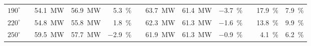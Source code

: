\documentclass[conf]{new-aiaa}
\begin{document}
\begin{table}[htpb!]
\begin{tabular}{@{}lcrrrcrrrcrr@{}}

\multicolumn{1}{l}{$190^{\circ}$} & & \SI[per-mode=symbol]{54.1}{\mega\watt} &\SI[per-mode=symbol]{56.9}{\mega\watt} &\SI[per-mode=symbol]{5.3}{\percent} & &\SI[per-mode=symbol]{63.7}{\mega\watt} &\SI[per-mode=symbol]{61.4}{\mega\watt} &\SI[per-mode=symbol]{-3.7}{\percent} & &\SI[per-mode=symbol]{17.9}{\percent} &\SI[per-mode=symbol]{7.9}{\percent} \\


\multicolumn{1}{l}{$220^{\circ}$} & & \SI[per-mode=symbol]{54.8}{\mega\watt} &\SI[per-mode=symbol]{55.8}{\mega\watt} &\SI[per-mode=symbol]{1.8}{\percent} & &\SI[per-mode=symbol]{62.3}{\mega\watt} &\SI[per-mode=symbol]{61.3}{\mega\watt} &\SI[per-mode=symbol]{-1.6}{\percent} & &\SI[per-mode=symbol]{13.8}{\percent} &\SI[per-mode=symbol]{9.9}{\percent} \\


\multicolumn{1}{l}{$250^{\circ}$} & & \SI[per-mode=symbol]{59.5}{\mega\watt} &\SI[per-mode=symbol]{57.7}{\mega\watt} &\SI[per-mode=symbol]{-2.9}{\percent} & &\SI[per-mode=symbol]{61.9}{\mega\watt} &\SI[per-mode=symbol]{61.3}{\mega\watt} &\SI[per-mode=symbol]{-0.9}{\percent} & &\SI[per-mode=symbol]{4.1}{\percent} &\SI[per-mode=symbol]{6.2}{\percent} \\



\end{tabular}
\end{table}
\end{document}
